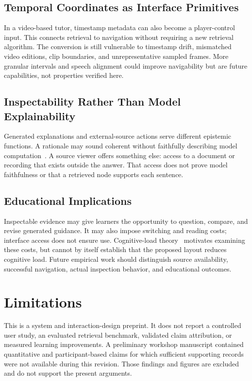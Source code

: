 \documentclass[manuscript,screen,nonacm]{acmart}
\begin{document}
\subsection{Temporal Coordinates as Interface Primitives}
In a video-based tutor, timestamp metadata can also become a player-control input. This connects retrieval to navigation without requiring a new retrieval algorithm. The conversion is still vulnerable to timestamp drift, mismatched video editions, clip boundaries, and unrepresentative sampled frames. More granular intervals and speech alignment could improve navigability but are future capabilities, not properties verified here.

\subsection{Inspectability Rather Than Model Explainability}
Generated explanations and external-source actions serve different epistemic functions. A rationale may sound coherent without faithfully describing model computation~\cite{miller2019explanation}. A source viewer offers something else: access to a document or recording that exists outside the answer. That access does not prove model faithfulness or that a retrieved node supports each sentence.

\subsection{Educational Implications}
Inspectable evidence may give learners the opportunity to question, compare, and revise generated guidance. It may also impose switching and reading costs; interface access does not ensure use. Cognitive-load theory~\cite{sweller2011cognitive} motivates examining these costs, but cannot by itself establish that the proposed layout reduces cognitive load. Future empirical work should distinguish source availability, successful navigation, actual inspection behavior, and educational outcomes.

\section{Limitations}
This is a system and interaction-design preprint. It does not report a controlled user study, an evaluated retrieval benchmark, validated claim attribution, or measured learning improvements. A preliminary workshop manuscript contained quantitative and participant-based claims for which sufficient supporting records were not available during this revision. Those findings and figures are excluded and do not support the present arguments.
\end{document}
